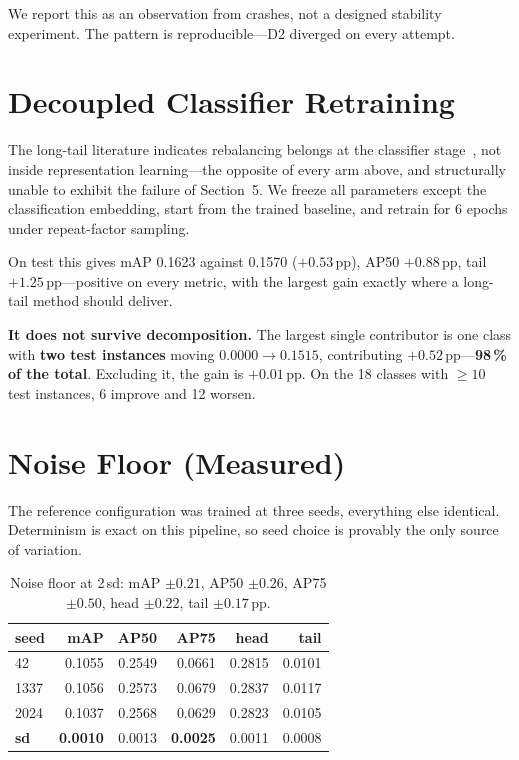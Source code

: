 \documentclass[11pt,letterpaper]{article}
\begin{document}
We report this as an observation from crashes, not a designed stability
experiment. The pattern is reproducible---D2 diverged on every attempt.

\section{Decoupled Classifier Retraining}

The long-tail literature indicates rebalancing belongs at the classifier
stage~\cite{kang2020decoupling,wang2019calibration}, not inside representation
learning---the opposite of every arm above, and structurally unable to exhibit
the failure of Section~5. We freeze all parameters except the classification
embedding, start from the trained baseline, and retrain for 6 epochs under
repeat-factor sampling.

On test this gives mAP 0.1623 against 0.1570 ($+0.53$\,pp), AP50 $+0.88$\,pp,
tail $+1.25$\,pp---positive on every metric, with the largest gain exactly where
a long-tail method should deliver.

\textbf{It does not survive decomposition.} The largest single contributor is
one class with \textbf{two test instances} moving $0.0000\to0.1515$,
contributing $+0.52$\,pp---\textbf{98\,\% of the total}. Excluding it, the gain
is $+0.01$\,pp. On the 18 classes with ${\ge}10$ test instances, 6 improve and
12 worsen.


\section{Noise Floor (Measured)}

The reference configuration was trained at three seeds, everything else
identical. Determinism is exact on this pipeline, so seed choice is provably the
only source of variation.

\begin{table}[h]
\centering\small
\begin{tabular}{lrrrrr}
\toprule
seed & mAP & AP50 & AP75 & head & tail \\
\midrule
42 & 0.1055 & 0.2549 & 0.0661 & 0.2815 & 0.0101 \\
1337 & 0.1056 & 0.2573 & 0.0679 & 0.2837 & 0.0117 \\
2024 & 0.1037 & 0.2568 & 0.0629 & 0.2823 & 0.0105 \\
\midrule
\textbf{sd} & \textbf{0.0010} & 0.0013 & \textbf{0.0025} & 0.0011 & 0.0008 \\
\bottomrule
\end{tabular}
\caption{Noise floor at 2\,sd: mAP $\pm0.21$, AP50 $\pm0.26$,
AP75 $\pm0.50$, head $\pm0.22$, tail $\pm0.17$\,pp.}
\end{table}
\end{document}
